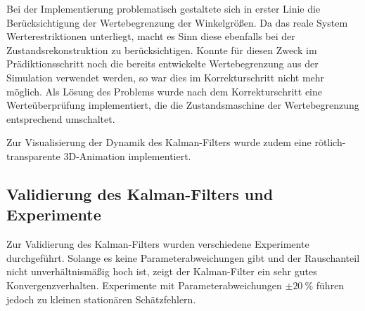 \documentclass[10pt,twocolumn]{article}
\begin{document}
	Bei der Implementierung problematisch gestaltete sich in erster Linie die Berücksichtigung der Wertebegrenzung der Winkelgrößen.
	Da das reale System Werterestriktionen unterliegt, macht es Sinn diese ebenfalls bei der Zustandsrekonstruktion zu berücksichtigen.
	Konnte für diesen Zweck im Prädiktionsschritt noch die bereits entwickelte Wertebegrenzung aus der Simulation verwendet werden, so war dies im Korrekturschritt nicht mehr möglich.
	Als Lösung des Problems wurde nach dem Korrekturschritt eine Werteüberprüfung implementiert, die die Zustandsmaschine der Wertebegrenzung entsprechend umschaltet.
	
	Zur Visualisierung der Dynamik des Kalman-Filters wurde zudem eine rötlich-transparente 3D-Animation implementiert.
	
	\subsection{Validierung des Kalman-Filters und Experimente}
	Zur Validierung des Kalman-Filters wurden verschiedene Experimente durchgeführt.
	Solange es keine Parameterabweichungen gibt und der Rauschanteil nicht unverhältnismäßig hoch ist, zeigt der Kalman-Filter ein sehr gutes Konvergenzverhalten.
	Experimente mit Parameterabweichungen $\pm \SI{20}{\percent}$ führen jedoch zu kleinen stationären Schätzfehlern.
	
	

	
	
	\nocite{ex3}
\end{document}
